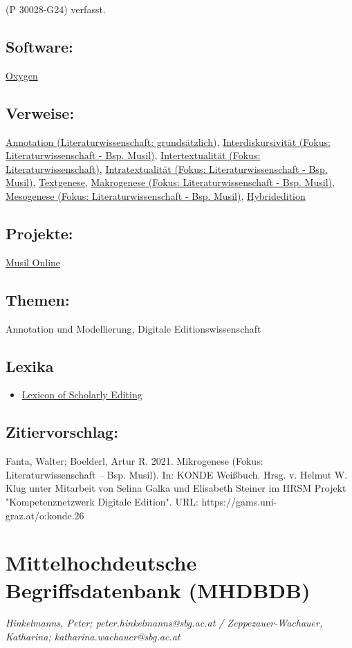 \documentclass{article}
\begin{document}
                  (P 30028-G24) verfasst.\subsection*{Software:}\href{http://oxygenxml.com/}{Oxygen}\subsection*{Verweise:}\href{https://gams.uni-graz.at/o:konde.17}{Annotation (Literaturwissenschaft:
                           grundsätzlich)}, \href{https://gams.uni-graz.at/o:konde.19}{Interdiskursivität (Fokus:
                           Literaturwissenschaft - Bsp. Musil)}, \href{https://gams.uni-graz.at/o:konde.20}{Intertextualität (Fokus:
                           Literaturwissenschaft)}, \href{https://gams.uni-graz.at/o:konde.21}{Intratextualität (Fokus:
                           Literaturwissenschaft - Bsp. Musil)}, \href{https://gams.uni-graz.at/o:konde.28}{Textgenese}, \href{https://gams.uni-graz.at/o:konde.23}{Makrogenese (Fokus:
                           Literaturwissenschaft - Bsp. Musil)}, \href{https://gams.uni-graz.at/o:konde.24}{Mesogenese (Fokus:
                           Literaturwissenschaft - Bsp. Musil)}, \href{https://gams.uni-graz.at/o:konde.96}{Hybridedition}\subsection*{Projekte:}\href{http://musilonline.at}{Musil Online}\subsection*{Themen:}Annotation und Modellierung, Digitale Editionswissenschaft\subsection*{Lexika}\begin{itemize}\item \href{https://lexiconse.uantwerpen.be/index.php/lexicon/microgenesis/}{Lexicon of Scholarly Editing}\end{itemize}\subsection*{Zitiervorschlag:}Fanta, Walter; Boelderl, Artur R. 2021. Mikrogenese (Fokus: Literaturwissenschaft – Bsp. Musil). In: KONDE Weißbuch. Hrsg. v. Helmut W. Klug unter Mitarbeit von Selina Galka und Elisabeth Steiner im HRSM Projekt "Kompetenznetzwerk Digitale Edition". URL: https://gams.uni-graz.at/o:konde.26\newpage\section*{Mittelhochdeutsche Begriffsdatenbank (MHDBDB)} \emph{Hinkelmanns, Peter; peter.hinkelmanns@sbg.ac.at / Zeppezauer-Wachauer,
                  Katharina; katharina.wachauer@sbg.ac.at }\\
        
\end{document}
